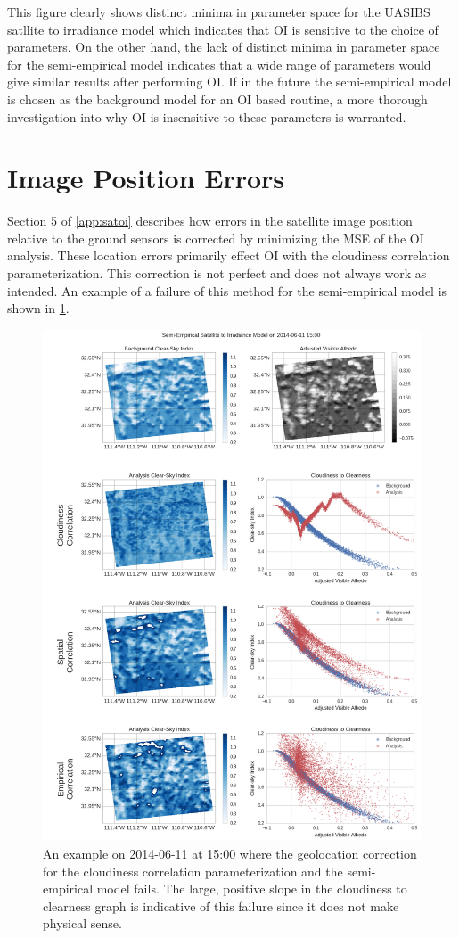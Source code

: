 This figure clearly shows distinct minima in parameter space for the
UASIBS satllite to irradiance model which indicates that  OI is
sensitive to the choice of parameters.
On the other hand, the lack of distinct minima in parameter space for
the semi-empirical model indicates that a wide range of parameters would
give similar results after performing OI.
If in the future the semi-empirical model is chosen as the background model
for an OI based routine, a more thorough investigation into why OI is
insensitive to these parameters is warranted.


\section{Image Position Errors}
Section 5 of \cref{app:satoi} describes how errors in the satellite
image position relative to the ground sensors is corrected by
minimizing the MSE of the OI analysis.
These location errors primarily effect OI with the cloudiness
correlation parameterization.
This correction is not perfect and does not always work as intended.
An example of a failure of this method for the semi-empirical model is
shown in \cref{fig:parallax_err}.


\begin{figure}[p]
\centering
\includegraphics[width=.9\textwidth]{figs/cld_to_clear_Semi-Empirical_2014-06-11.png}
\caption[An example of a failure of the geolocation correction]{
  An example on 2014-06-11 at 15:00 where the geolocation correction
  for the cloudiness correlation parameterization and the
  semi-empirical model fails. The large, positive slope in the
  cloudiness to clearness graph is indicative of this failure since it
  does not make physical sense.}
\label{fig:parallax_err}
\end{figure}

